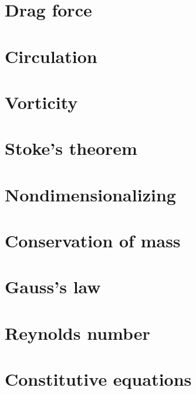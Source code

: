 \documentclass[12pt]{report}
\begin{document}
\chapter{Drag force}





\chapter{Circulation}



\chapter{Vorticity}



\chapter{Stoke's theorem}



\chapter{Nondimensionalizing}




\chapter{Conservation of mass}



\chapter{Gauss's law}

\chapter{Reynolds number}



\chapter{Constitutive equations}
\end{document}
